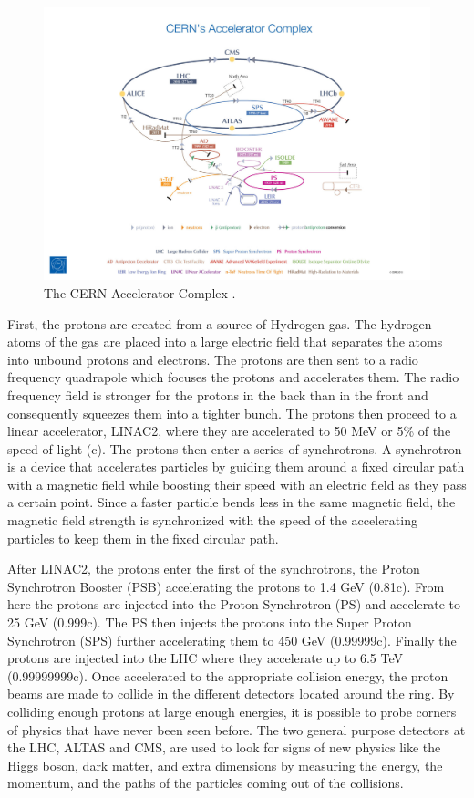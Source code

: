 \begin{figure}[h!]
  \centering
  \includegraphics[width=6in]{images/cern_accel_complex.png}
  \caption[The CERN Accelerator Complex.]
   {The CERN Accelerator Complex \cite{cernaccelcomplex}.}
  \label{fig:cernaccel}
\end{figure}

First, the protons are created from a source of Hydrogen gas. The hydrogen atoms of the gas are placed into a large electric field that separates the atoms into unbound protons and electrons. The protons are then sent to a radio frequency quadrapole which focuses the protons and accelerates them. The radio frequency field is stronger for the protons in the back than in the front and consequently squeezes them into a tighter bunch. The protons then proceed to a linear accelerator, LINAC2, where they are accelerated to 50 MeV or 5\% of the speed of light (c). The protons then enter a series of synchrotrons. A synchrotron is a device that accelerates particles by guiding them around a fixed circular path with a magnetic field while boosting their speed with an electric field as they pass a certain point. Since a faster particle bends less in the same magnetic field, the magnetic field strength is synchronized with the speed of the accelerating particles to keep them in the fixed circular path. 

After LINAC2, the protons enter the first of the synchrotrons, the Proton Synchrotron Booster (PSB) accelerating the protons to 1.4 GeV (0.81c). From here the protons are injected into the Proton Synchrotron (PS) and accelerate to 25 GeV (0.999c). The PS then injects the protons into the Super Proton Synchrotron (SPS) further accelerating them to 450 GeV (0.99999c). Finally the protons are injected into the LHC where they accelerate up to 6.5 TeV (0.99999999c). Once accelerated to the appropriate collision energy, the proton beams are made to collide in the different detectors located around the ring. By colliding enough protons at large enough energies, it is possible to probe corners of physics that have never been seen before. The two general purpose detectors at the LHC, ALTAS and CMS, are used to look for signs of new physics like the Higgs boson, dark matter, and extra dimensions by measuring the energy, the momentum, and the paths of the particles coming out of the collisions.

